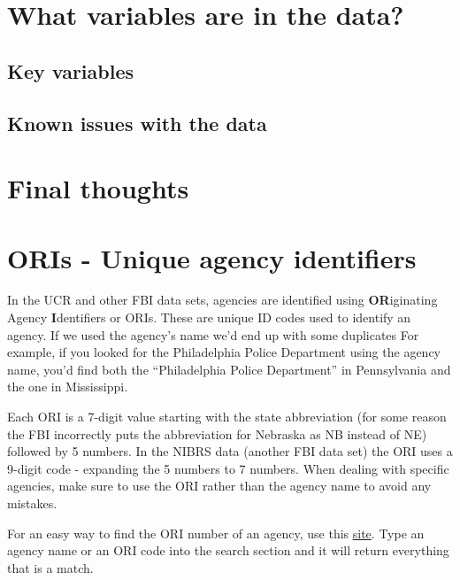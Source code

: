 \documentclass[
  12pt,
  openany]{book}
\begin{document}
\hypertarget{what-variables-are-in-the-data}{%
\section{What variables are in the data?}\label{what-variables-are-in-the-data}}

\hypertarget{key-variables}{%
\subsection{Key variables}\label{key-variables}}

\hypertarget{known-issues-with-the-data}{%
\subsection{Known issues with the data}\label{known-issues-with-the-data}}

\hypertarget{final-thoughts}{%
\section{Final thoughts}\label{final-thoughts}}

\hypertarget{oris---unique-agency-identifiers}{%
\section{ORIs - Unique agency identifiers}\label{oris---unique-agency-identifiers}}

In the UCR and other FBI data sets, agencies are identified using \textbf{OR}iginating Agency \textbf{I}dentifiers or ORIs. These are unique ID codes used to identify an agency. If we used the agency's name we'd end up with some duplicates For example, if you looked for the Philadelphia Police Department using the agency name, you'd find both the ``Philadelphia Police Department'' in Pennsylvania and the one in Mississippi.

Each ORI is a 7-digit value starting with the state abbreviation (for some reason the FBI incorrectly puts the abbreviation for Nebraska as NB instead of NE) followed by 5 numbers. In the NIBRS data (another FBI data set) the ORI uses a 9-digit code - expanding the 5 numbers to 7 numbers. When dealing with specific agencies, make sure to use the ORI rather than the agency name to avoid any mistakes.

For an easy way to find the ORI number of an agency, use this \href{http://crimedatatool.com/crosswalk.html}{site}. Type an agency name or an ORI code into the search section and it will return everything that is a match.
\end{document}
